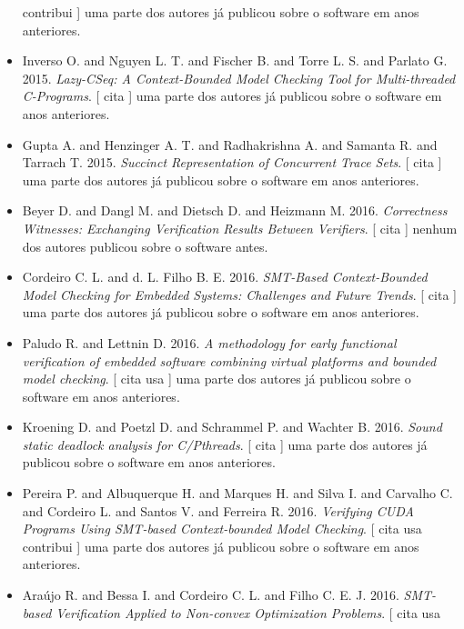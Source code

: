 \begin{itemize}
          contribui
      ]
uma parte dos autores já publicou sobre o software em anos anteriores.
\item Inverso O. and Nguyen L. T. and Fischer B. and Torre L. S. and Parlato G.
      2015.
        \textit{ Lazy-CSeq: A Context-Bounded Model Checking Tool for Multi-threaded C-Programs}.
      [
          cita
      ]
uma parte dos autores já publicou sobre o software em anos anteriores.
\item Gupta A. and Henzinger A. T. and Radhakrishna A. and Samanta R. and Tarrach T.
      2015.
        \textit{ Succinct Representation of Concurrent Trace Sets}.
      [
          cita
      ]
uma parte dos autores já publicou sobre o software em anos anteriores.
\item Beyer D. and Dangl M. and Dietsch D. and Heizmann M.
      2016.
        \textit{ Correctness Witnesses: Exchanging Verification Results Between Verifiers}.
      [
          cita
      ]
nenhum dos autores publicou sobre o software antes.
\item Cordeiro C. L. and d. L. Filho B. E.
      2016.
        \textit{ SMT-Based Context-Bounded Model Checking for Embedded Systems: Challenges and Future Trends}.
      [
          cita
      ]
uma parte dos autores já publicou sobre o software em anos anteriores.
\item Paludo R. and Lettnin D.
      2016.
        \textit{ A methodology for early functional verification of embedded software combining virtual platforms and bounded model checking}.
      [
          cita
          usa
      ]
uma parte dos autores já publicou sobre o software em anos anteriores.
\item Kroening D. and Poetzl D. and Schrammel P. and Wachter B.
      2016.
        \textit{ Sound static deadlock analysis for C/Pthreads}.
      [
          cita
      ]
uma parte dos autores já publicou sobre o software em anos anteriores.
\item Pereira P. and Albuquerque H. and Marques H. and Silva I. and Carvalho C. and Cordeiro L. and Santos V. and Ferreira R.
      2016.
        \textit{ Verifying CUDA Programs Using SMT-based Context-bounded Model Checking}.
      [
          cita
          usa
          contribui
      ]
uma parte dos autores já publicou sobre o software em anos anteriores.
\item Araújo R. and Bessa I. and Cordeiro C. L. and Filho C. E. J.
      2016.
        \textit{ SMT-based Verification Applied to Non-convex Optimization Problems}.
      [
          cita
          usa

\end{itemize}
